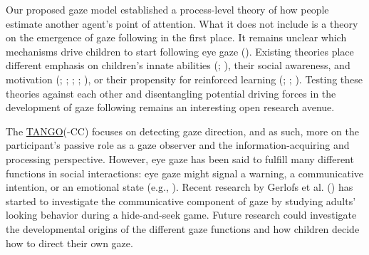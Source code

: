 \documentclass[
]{scrbook}
\begin{document}
Our proposed gaze model established a process-level theory of how people estimate another agent's point of attention. What it does not include is a theory on the emergence of gaze following in the first place. It remains unclear which mechanisms drive children to start following eye gaze (). Existing theories place different emphasis on children's innate abilities (; ), their social awareness, and motivation (; ; ; ; ), or their propensity for reinforced learning (; ; ). Testing these theories against each other and disentangling potential driving forces in the development of gaze following remains an interesting open research avenue.

The \hyperref[acronyms_TANGO]{TANGO}(-CC) focuses on detecting gaze direction, and as such, more on the participant's passive role as a gaze observer and the information-acquiring and processing perspective. However, eye gaze has been said to fulfill many different functions in social interactions: eye gaze might signal a warning, a communicative intention, or an emotional state (e.g., ). Recent research by Gerlofs et al. () has started to investigate the communicative component of gaze by studying adults' looking behavior during a hide-and-seek game. Future research could investigate the developmental origins of the different gaze functions and how children decide how to direct their own gaze.
\end{document}
